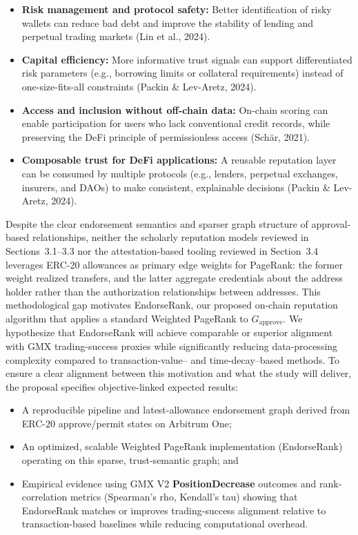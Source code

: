 \begin{itemize}
\item[\textbullet] \textbf{Risk management and protocol safety: }Better identification of risky wallets can reduce bad debt and improve the stability of lending and perpetual trading markets (Lin et al., 2024).
\item[\textbullet] \textbf{Capital efficiency: }More informative trust signals can support differentiated risk parameters (e.g., borrowing limits or collateral requirements) instead of one-size-fits-all constraints (Packin \& Lev-Aretz, 2024).
\item[\textbullet] \textbf{Access and inclusion without off-chain data: }On-chain scoring can enable participation for users who lack conventional credit records, while preserving the DeFi principle of permissionless access (Sch\"{a}r, 2021).
\item[\textbullet] \textbf{Composable trust for DeFi applications: }A reusable reputation layer can be consumed by multiple protocols (e.g., lenders, perpetual exchanges, insurers, and DAOs) to make consistent, explainable decisions (Packin \& Lev-Aretz, 2024).
\end{itemize}
Despite the clear endorsement semantics and sparser graph structure of approval-based relationships, neither the scholarly reputation models reviewed in Sections~3.1--3.3 nor the attestation-based tooling reviewed in Section~3.4 leverages ERC-20 allowances as primary edge weights for PageRank: the former weight realized transfers, and the latter aggregate credentials about the address holder rather than the authorization relationships between addresses. This methodological gap motivates EndorseRank, our proposed on-chain reputation algorithm that applies a standard Weighted PageRank to $G_{\text{approve}}$. We hypothesize that EndorseRank will achieve comparable or superior alignment with GMX trading-success proxies while significantly reducing data-processing complexity compared to transaction-value-- and time-decay--based methods. To ensure a clear alignment between this motivation and what the study will deliver, the proposal specifies objective-linked expected results:


\begin{itemize}
\item[\textbullet] A reproducible pipeline and latest-allowance endorsement graph derived from ERC-20 approve/permit states on Arbitrum One;
\item[\textbullet] An optimized, scalable Weighted PageRank implementation (EndorseRank) operating on this sparse, trust-semantic graph; and
\item[\textbullet] Empirical evidence using GMX V2 \textbf{PositionDecrease} outcomes and rank-correlation metrics (Spearman's rho, Kendall's tau) showing that EndorseRank matches or improves trading-success alignment relative to transaction-based baselines while reducing computational overhead.
\end{itemize}
